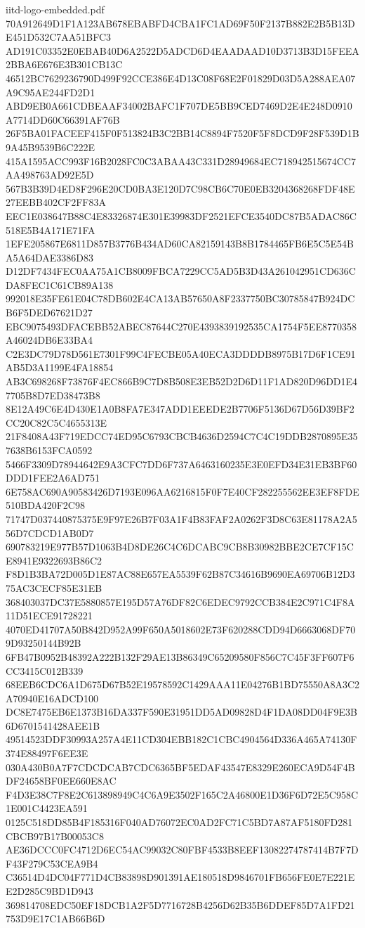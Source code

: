 \begin{filecontents*}[overwrite]{iitd-logo-embedded.pdf}
70A912649D1F1A123AB678EBABFD4CBA1FC1AD69F50F2137B882E2B5B13DE451D532C7AA51BFC3
AD191C03352E0EBAB40D6A2522D5ADCD6D4EAADAAD10D3713B3D15FEEA2BBA6E676E3B301CB13C
46512BC7629236790D499F92CCE386E4D13C08F68E2F01829D03D5A288AEA07A9C95AE244FD2D1
ABD9EB0A661CDBEAAF34002BAFC1F707DE5BB9CED7469D2E4E248D0910A7714DD60C66391AF76B
26F5BA01FACEEF415F0F513824B3C2BB14C8894F7520F5F8DCD9F28F539D1B9A45B9539B6C222E
415A1595ACC993F16B2028FC0C3ABAA43C331D28949684EC718942515674CC7AA498763AD92E5D
567B3B39D4ED8F296E20CD0BA3E120D7C98CB6C70E0EB3204368268FDF48E27EEBB402CF2FF83A
EEC1E038647B88C4E83326874E301E39983DF2521EFCE3540DC87B5ADAC86C518E5B4A171E71FA
1EFE205867E6811D857B3776B434AD60CA82159143B8B1784465FB6E5C5E54BA5A64DAE3386D83
D12DF7434FEC0AA75A1CB8009FBCA7229CC5AD5B3D43A261042951CD636CDA8FEC1C61CB89A138
992018E35FE61E04C78DB602E4CA13AB57650A8F2337750BC30785847B924DCB6F5DED67621D27
EBC9075493DFACEBB52ABEC87644C270E4393839192535CA1754F5EE8770358A46024DB6E33BA4
C2E3DC79D78D561E7301F99C4FECBE05A40ECA3DDDDB8975B17D6F1CE91AB5D3A1199E4FA18854
AB3C698268F73876F4EC866B9C7D8B508E3EB52D2D6D11F1AD820D96DD1E47705B8D7ED38473B8
8E12A49C6E4D430E1A0B8FA7E347ADD1EEEDE2B7706F5136D67D56D39BF2CC20C82C5C4655313E
21F8408A43F719EDCC74ED95C6793CBCB4636D2594C7C4C19DDB2870895E357638B6153FCA0592
5466F3309D78944642E9A3CFC7DD6F737A6463160235E3E0EFD34E31EB3BF60DDD1FEE2A6AD751
6E758AC690A90583426D7193E096AA6216815F0F7E40CF282255562EE3EF8FDE510BDA420F2C98
71747D037440875375E9F97E26B7F03A1F4B83FAF2A0262F3D8C63E81178A2A556D7CDCD1AB0D7
690783219E977B57D1063B4D8DE26C4C6DCABC9CB8B30982BBE2CE7CF15CE8941E9322693B86C2
F8D1B3BA72D005D1E87AC88E657EA5539F62B87C34616B9690EA69706B12D375AC3CECF85E31EB
368403037DC37E5880857E195D57A76DF82C6EDEC9792CCB384E2C971C4F8A11D51ECE91728221
4070ED41707A50B842D952A99F650A5018602E73F620288CDD94D6663068DF709D93250144B92B
6FB47B0952B48392A222B132F29AE13B86349C65209580F856C7C45F3FF607F6CC3415C012B339
68EEB6CDC6A1D675D67B52E19578592C1429AAA11E04276B1BD75550A8A3C2A70940E16ADCD100
DC8E7475EB6E1373B16DA337F590E31951DD5AD09828D4F1DA08DD04F9E3B6D6701541428AEE1B
49514523DDF30993A257A4E11CD304EBB182C1CBC4904564D336A465A74130F374E88497F6EE3E
030A430B0A7F7CDCDCAB7CDC6365BF5EDAF43547E8329E260ECA9D54F4BDF24658BF0EE660E8AC
F4D3E38C7F8E2C613898949C4C6A9E3502F165C2A46800E1D36F6D72E5C958C1E001C4423EA591
0125C518DD85B4F185316F040AD76072EC0AD2FC71C5BD7A87AF5180FD281CBCB97B17B00053C8
AE36DCCC0FC4712D6EC54AC99032C80FBF4533B8EEF13082274787414B7F7DF43F279C53CEA9B4
C36514D4DC04F771D4CB83898D901391AE180518D9846701FB656FE0E7E221EE2D285C9BD1D943
369814708EDC50EF18DCB1A2F5D7716728B4256D62B35B6DDEF85D7A1FD21753D9E17C1AB66B6D

\end{filecontents*}
